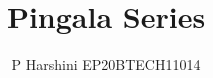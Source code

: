 \documentclass[journal,12pt,twocolumn]{IEEEtran}
\begin{document}
\makeatletter
{}
\makeatother
\let\StandardTheFigure\thefigure
\renewcommand{\thefigure}{\theproblem}
\def\putbox#1#2#3{\makebox[0in][l]{\makebox[#1][l]{}\raisebox{\baselineskip}[0in][0in]{\raisebox{#2}[0in][0in]{#3}}}}
     \def\rightbox#1{\makebox[0in][r]{#1}}
     \def\centbox#1{\makebox[0in]{#1}}
     \def\topbox#1{\raisebox{-\baselineskip}[0in][0in]{#1}}
     \def\midbox#1{\raisebox{-0.5\baselineskip}[0in][0in]{#1}}
\vspace{3cm}
\title{ 
Pingala Series
}
%
%
%
\author{P Harshini EP20BTECH11014}%
% 
%
\end{document}
